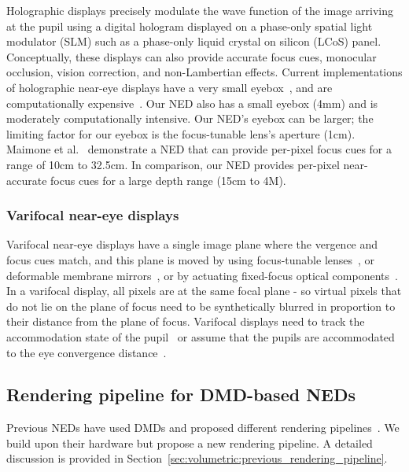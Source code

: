 Holographic displays precisely modulate the wave function of the image arriving at the pupil using a digital hologram displayed on a phase-only spatial light modulator (SLM) such as a phase-only liquid crystal on silicon (LCoS) panel. Conceptually, these displays can also provide accurate focus cues, monocular occlusion, vision correction, and non-Lambertian effects. Current implementations of holographic near-eye displays have a very small eyebox~\cite{Maimone2017Holographic}, and are computationally expensive~\cite{Shi2017Near,Maimone2017Holographic,Matsuda2017focal}. Our NED also has a small eyebox (4mm) and is moderately computationally intensive. Our NED's eyebox can be larger; the limiting factor for our eyebox is the focus-tunable lens's aperture (1cm). Maimone et al.~\cite{Maimone2017Holographic} demonstrate a NED that can provide per-pixel focus cues for a range of 10cm to 32.5cm. In comparison, our NED provides per-pixel near-accurate focus cues for a large depth range (15cm to 4M).

\subsubsection{Varifocal near-eye displays}
\label{sec:volumetric:varifocal_displays}
Varifocal near-eye displays have a single image plane where the vergence and focus cues match, and this plane is moved by using focus-tunable lenses~\cite{Padmanaban2016Optimizing,Liu2008Optical,Konrad2016Novel}, or deformable membrane mirrors~\cite{Dunn2017Wide}, or by actuating fixed-focus optical components~\cite{Aksit2017Near}. In a varifocal display, all pixels are at the same focal plane - so virtual pixels that do not lie on the plane of focus need to be synthetically blurred in proportion to their distance from the plane of focus. Varifocal displays need to track the accommodation state of the pupil~\cite{Padmanaban2016Optimizing} or assume that the pupils are accommodated to the eye convergence distance~\cite{Dunn2017Wide,Aksit2017Near}. 

\subsection{Rendering pipeline for DMD-based NEDs}
Previous NEDs have used DMDs and proposed different rendering pipelines~\cite{Lincoln2016motion,Lincoln2017scene,Hu2014design,Hu2015Design}. We build upon their hardware but propose a new rendering pipeline. A detailed discussion is provided in Section~\ref{sec:volumetric:previous_rendering_pipeline}.
